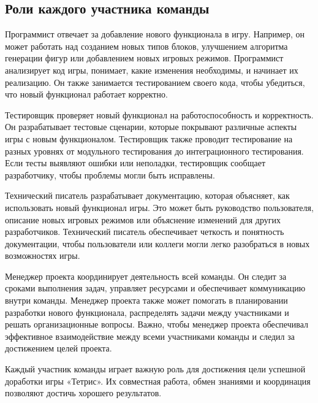 \documentclass[letterpaper,10pt,russian]{sphinxmanual}
\begin{document}
\subsection{Роли каждого участника команды}
\label{\detokenize{educational_materials/team_work_on_a_project/content:id6}}
\sphinxAtStartPar
{}
Программист отвечает за добавление нового функционала в игру. Например, он может работать над созданием новых типов блоков, улучшением алгоритма генерации фигур или добавлением новых игровых режимов. Программист анализирует код игры, понимает, какие изменения необходимы, и начинает их реализацию. Он также занимается тестированием своего кода, чтобы убедиться, что новый функционал работает корректно.

\sphinxAtStartPar
{}
Тестировщик проверяет новый функционал на работоспособность и корректность. Он разрабатывает тестовые сценарии, которые покрывают различные аспекты игры с новым функционалом. Тестировщик также проводит тестирование на разных уровнях \sphinxhyphen{} от модульного тестирования до интеграционного тестирования. Если тесты выявляют ошибки или неполадки, тестировщик сообщает разработчику, чтобы проблемы могли быть исправлены.

\sphinxAtStartPar
{}
Технический писатель разрабатывает документацию, которая объясняет, как использовать новый функционал игры. Это может быть руководство пользователя, описание новых игровых режимов или объяснение изменений для других разработчиков. Технический писатель обеспечивает четкость и понятность документации, чтобы пользователи или коллеги могли легко разобраться в новых возможностях игры.

\sphinxAtStartPar
{}
Менеджер проекта координирует деятельность всей команды. Он следит за сроками выполнения задач, управляет ресурсами и обеспечивает коммуникацию внутри команды. Менеджер проекта также может помогать в планировании разработки нового функционала, распределять задачи между участниками и решать организационные вопросы. Важно, чтобы менеджер проекта обеспечивал эффективное взаимодействие между всеми участниками команды и следил за достижением целей проекта.

\sphinxAtStartPar
Каждый участник команды играет важную роль для достижения цели \sphinxhyphen{} успешной доработки игры «Тетрис». Их совместная работа, обмен знаниями и координация позволяют достичь хорошего результатов.
\end{document}
